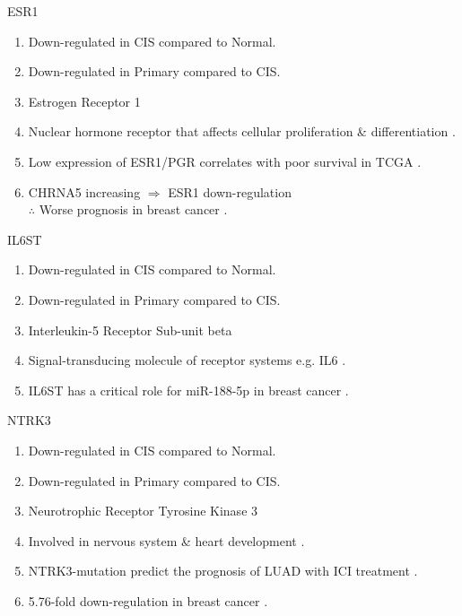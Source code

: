 \documentclass{beamer}
\begin{document}
\begin{frame}[allowframebreaks]
        \begin{block}{ESR1}
            \begin{enumerate}
                \item Down-regulated in CIS compared to Normal.
                \item Down-regulated in Primary compared to CIS.
                \item Estrogen Receptor 1
                \item Nuclear hormone receptor that affects cellular proliferation \& differentiation \cite{ESR1-1}.
                \item Low expression of ESR1/PGR correlates with poor survival in TCGA \cite{ESR1-2}.
                \item CHRNA5 increasing $\Rightarrow$ ESR1 down-regulation \\
                    $\therefore$ Worse prognosis in breast cancer \cite{ESR1-3}.
            \end{enumerate}
        \end{block}

        \begin{block}{IL6ST}
            \begin{enumerate}
                \item Down-regulated in CIS compared to Normal.
                \item Down-regulated in Primary compared to CIS.
                \item Interleukin-5 Receptor Sub-unit beta
                \item Signal-transducing molecule of receptor systems e.g. IL6 \cite{IL6ST-1}.
                \item IL6ST has a critical role for miR-188-5p in breast cancer \cite{IL6ST-2}.
            \end{enumerate}
        \end{block}

        \begin{block}{NTRK3}
            \begin{enumerate}
                \item Down-regulated in CIS compared to Normal.
                \item Down-regulated in Primary compared to CIS.
                \item Neurotrophic Receptor Tyrosine Kinase 3
                \item Involved in nervous system \& heart development \cite{NTRK3-1}.
                \item NTRK3-mutation predict the prognosis of LUAD with ICI treatment \cite{NTRK3-2}.
                \item 5.76-fold down-regulation in breast cancer \cite{NTRK3-3}.
            \end{enumerate}
        \end{block}


\end{frame}
\end{document}
